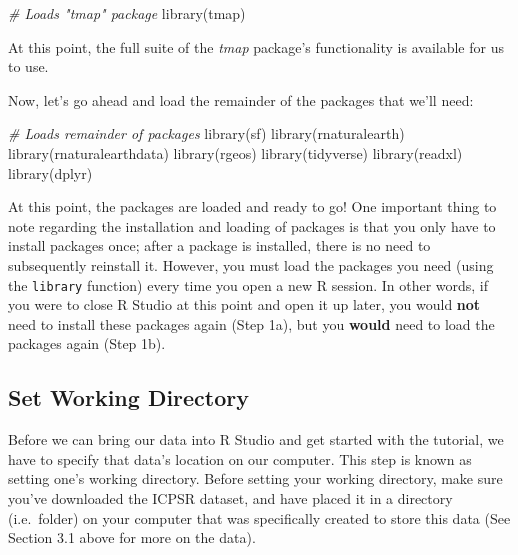 \documentclass[
]{article}
\newenvironment{Shaded}{\begin{snugshade}}{\end{snugshade}}
\newcommand{\CommentTok}[1]{\textcolor[rgb]{0.56,0.35,0.01}{\textit{#1}}}
\newcommand{\FunctionTok}[1]{\textcolor[rgb]{0.00,0.00,0.00}{#1}}
\newcommand{\NormalTok}[1]{#1}
\begin{document}
\begin{Shaded}
\begin{Highlighting}[]
\CommentTok{\# Loads "tmap" package}
\FunctionTok{library}\NormalTok{(tmap)}
\end{Highlighting}
\end{Shaded}

At this point, the full suite of the \emph{tmap} package's functionality is available for us to use.

Now, let's go ahead and load the remainder of the packages that we'll need:

\begin{Shaded}
\begin{Highlighting}[]
\CommentTok{\# Loads remainder of packages}
\FunctionTok{library}\NormalTok{(sf)}
\FunctionTok{library}\NormalTok{(rnaturalearth)}
\FunctionTok{library}\NormalTok{(rnaturalearthdata)}
\FunctionTok{library}\NormalTok{(rgeos)}
\FunctionTok{library}\NormalTok{(tidyverse)}
\FunctionTok{library}\NormalTok{(readxl)}
\FunctionTok{library}\NormalTok{(dplyr)}
\end{Highlighting}
\end{Shaded}

At this point, the packages are loaded and ready to go! One important thing to note regarding the installation and loading of packages is that you only have to install packages once; after a package is installed, there is no need to subsequently reinstall it. However, you must load the packages you need (using the \texttt{library} function) every time you open a new R session. In other words, if you were to close R Studio at this point and open it up later, you would \textbf{not} need to install these packages again (Step 1a), but you \textbf{would} need to load the packages again (Step 1b).

\hypertarget{set-working-directory}{%
\subsection{Set Working Directory}\label{set-working-directory}}

Before we can bring our data into R Studio and get started with the tutorial, we have to specify that data's location on our computer. This step is known as setting one's working directory. Before setting your working directory, make sure you've downloaded the ICPSR dataset, and have placed it in a directory (i.e.~folder) on your computer that was specifically created to store this data (See Section 3.1 above for more on the data).
\end{document}
